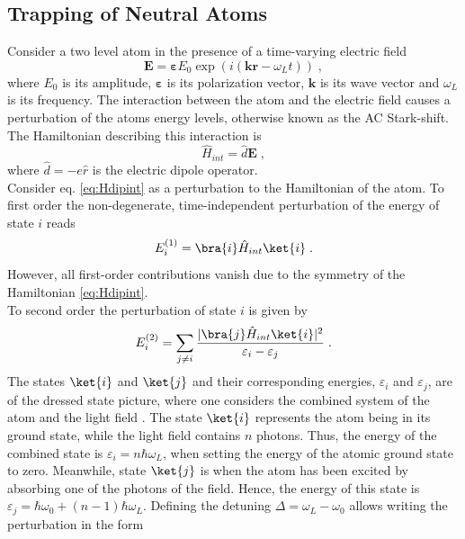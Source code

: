 \subsection{Trapping of Neutral Atoms}
Consider a two level atom in the presence of a time-varying electric field
\begin{equation}
	\boldsymbol{E} = \boldsymbol{\varepsilon} E_0 \exp \left( i(\boldsymbol{k} \boldsymbol{r} - \omega_L t) \right) \; ,
\end{equation}
where $E_0$ is its amplitude, $\boldsymbol{\varepsilon}$ is its polarization vector, $\boldsymbol{k}$ is its wave vector and $\omega_L$ is its frequency. The interaction between the atom and the electric field causes a perturbation of the atoms energy levels, otherwise known as the AC Stark-shift. The Hamiltonian describing this interaction is
\begin{equation}
	\hat{H}_{int} = \hat{d} \boldsymbol{E} \; , \label{eq:Hdipint}
\end{equation}
where $\hat{d} = -e \hat{r}$ is the electric dipole operator.\\
Consider eq. \eqref{eq:Hdipint} as a perturbation to the Hamiltonian of the atom. To first order the non-degenerate, time-independent perturbation of the energy of state $i$ reads
\begin{equation}
	E_{i}^{(1)} = \bra{i} \hat{H}_{int} \ket{i} \; .
\end{equation}
However, all first-order contributions vanish due to the symmetry of the Hamiltonian \eqref{eq:Hdipint}.\\
To second order the perturbation of state $i$ is given by
\begin{equation}
	E_i^{(2)} = \sum_{j \neq i} \frac{ |\bra{j} \hat{H}_{int}\ket{i}|^2}{\varepsilon_i - \varepsilon_j} \; .
\end{equation}
The states $\ket{i}$ and $\ket{j}$ and their corresponding energies, $\varepsilon_i$ and $\varepsilon_j$, are of the dressed state picture, where one considers the combined system of the atom and the light field \cite{cohen1992atom}. The state $\ket{i}$ represents the atom being in its ground state, while the light field contains $n$ photons. Thus, the energy of the combined state is $\varepsilon_i = n \hbar \omega_L$, when setting the energy of the atomic ground state to zero. Meanwhile, state $\ket{j}$ is when the atom has been excited by absorbing one of the photons of the field. Hence, the energy of this state is $\varepsilon_j = \hbar \omega_0 + (n-1) \hbar \omega_L$. Defining the detuning $\Delta = \omega_L - \omega_0$ allows writing the perturbation in the form
